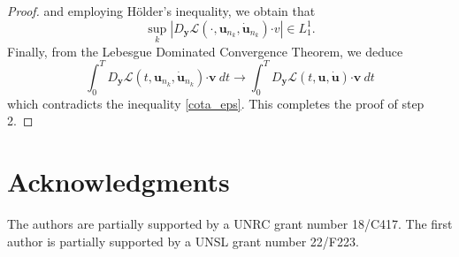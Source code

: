 \documentclass[twoside]{article}
\theoremstyle{remark}
\renewcommand{\b}[1]{\boldsymbol{#1}}
\newcommand{\ccdot}{\b{\cdot}}
\begin{document}
\begin{proof}
and employing H\"older's inequality, we obtain that
\[\sup_k|D_{\b{y}}\mathcal{L}(\cdot,\b{u}_{n_k},\b{\dot{u}}_{n_k})\ccdot v| \in L^1_1.\]
  Finally, from the Lebesgue Dominated Convergence Theorem, we deduce
\begin{equation}\label{conv_debil}\int_0^T  D_{\b{y}}\mathcal{L}(t,\b{u}_{n_k},\b{\dot{u}}_{n_k})\ccdot\b{ v} \ dt \to \int_0^T D_{\b{y}}\mathcal{L}(t,\b{u},\b{\dot{u}})\ccdot\b{ v}\ dt \end{equation}
which contradicts the inequality \eqref{cota_eps}. This completes the proof of step 2.



\end{proof}


\section*{Acknowledgments}
The authors are partially supported by a UNRC grant number 18/C417. The first author is  partially supported by a  UNSL grant number 22/F223. 




 
 
\end{document}
